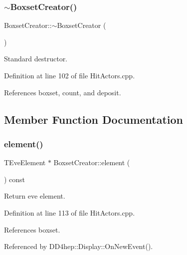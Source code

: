 \subsubsection{\texorpdfstring{$\sim$\+Boxset\+Creator()}{~BoxsetCreator()}}
{\footnotesize\ttfamily Boxset\+Creator\+::$\sim$\+Boxset\+Creator (\begin{DoxyParamCaption}{ }\end{DoxyParamCaption})\hspace{0.3cm}{\ttfamily [virtual]}}



Standard destructor. 



Definition at line 102 of file Hit\+Actors.\+cpp.



References boxset, count, and deposit.



\subsection{Member Function Documentation}
\hypertarget{struct_d_d4hep_1_1_boxset_creator_adb521f21af3ee2f647e9f3c3219611aa}{}\label{struct_d_d4hep_1_1_boxset_creator_adb521f21af3ee2f647e9f3c3219611aa} 
\subsubsection{\texorpdfstring{element()}{element()}}
{\footnotesize\ttfamily T\+Eve\+Element $\ast$ Boxset\+Creator\+::element (\begin{DoxyParamCaption}{ }\end{DoxyParamCaption}) const}



Return eve element. 



Definition at line 113 of file Hit\+Actors.\+cpp.



References boxset.



Referenced by D\+D4hep\+::\+Display\+::\+On\+New\+Event().

\hypertarget{struct_d_d4hep_1_1_boxset_creator_a25f63197d03ad33193ac3c77207db808}{}\label{struct_d_d4hep_1_1_boxset_creator_a25f63197d03ad33193ac3c77207db808} 
